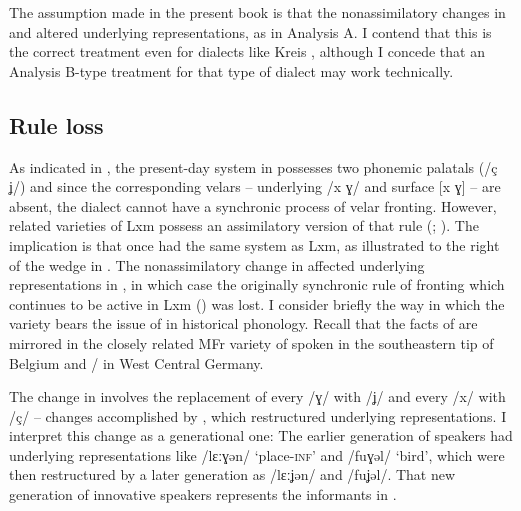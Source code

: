 The assumption made in the present book is that the nonassimilatory changes in  and  altered underlying representations, as in Analysis A. I contend that this is the correct treatment even for dialects like Kreis , although I concede that an Analysis B-type treatment for that type of dialect may work technically.

\subsection{Rule loss}\label{sec:14.6.3}

As indicated in , the present-day  system in  possesses two phonemic palatals (/ç ʝ/) and since the corresponding velars -- underlying /x ɣ/ and surface [x ɣ] -- are absent, the dialect cannot have a synchronic process of velar fronting. However, related varieties of Lxm \citep{Gilles1999} possess an assimilatory version of that rule (; ). The implication is that  once had the same system as Lxm, as illustrated to the right of the wedge in . The nonassimilatory change in  affected underlying representations in , in which case the originally synchronic rule of fronting which continues to be active in Lxm () was lost. I consider briefly the way in which the  variety bears the issue of  in historical phonology. Recall that the facts of  are mirrored in the closely related MFr variety of  spoken in the southeastern tip of Belgium and / in West Central Germany.

The change in  involves the replacement of every /ɣ/ with /ʝ/ and every /x/ with /ç/ -- changes accomplished by , which restructured underlying representations. I interpret this change as a generational one: The earlier generation of speakers had underlying representations like /lɛːɣən/ ‘place-\textsc{inf}’ and /fuɣəl/ ‘bird’, which were then restructured by a later generation as /lɛːʝən/ and  /fuʝəl/. That new generation of innovative speakers represents the informants in \citet{Bruch1952}.

